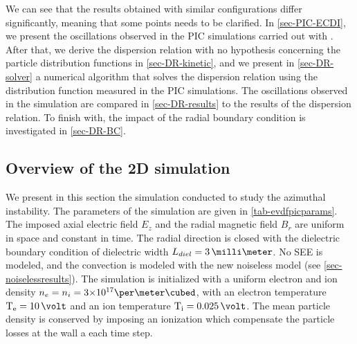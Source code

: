     \vspace{1ex}
    We can see that the results obtained with similar configurations differ significantly, meaning that some points needs to be clarified.
    In \cref{sec-PIC-ECDI}, we present the oscillations observed in the \ac{PIC} simulations carried out with \LPPic.
    After that, we derive the dispersion relation with no hypothesis concerning the particle distribution functions in \cref{sec-DR-kinetic}, and we present in \cref{sec-DR-solver} a numerical algorithm that solves the dispersion relation using the distribution function measured in the \ac{PIC} simulations.
    The oscillations observed in the simulation are compared in \cref{sec-DR-results} to the results of the dispersion relation.
    To finish with, the impact of the radial boundary condition is investigated in \cref{sec-DR-BC}.


  \subsection{Overview of the 2D simulation} \label{subsec-lppic_ECDI}
  
    
    We present in this section the simulation conducted to study the azimuthal instability.
    The parameters of the simulation are given in \cref{tab-evdfpicparams}.
    The imposed axial electric field $E_z$ and the radial magnetic field $B_r$ are uniform in space and constant in time.
    The radial direction is closed with the dielectric boundary condition of dielectric width $L_{diel}=3\,\milli\meter$.
    No \ac{SEE} is modeled, and the convection is modeled with the new noiseless model (see \cref{sec-noiselessresults}).
    The simulation is initialized with a uniform electron and ion density $n_e = n_i = \sn{3}{17}\per\meter\cubed$, with an electron temperature $\Te=10\,\volt$ and an ion temperature $\Ti=0.025\,\volt$.
    The mean particle density is conserved by imposing an ionization  which compensate the particle losses at the wall a each time step.
    
